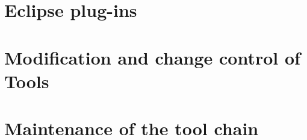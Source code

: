 \section{Eclipse plug-ins
}
\section{Modification and change control of Tools}

\section{Maintenance of the tool chain}
 

